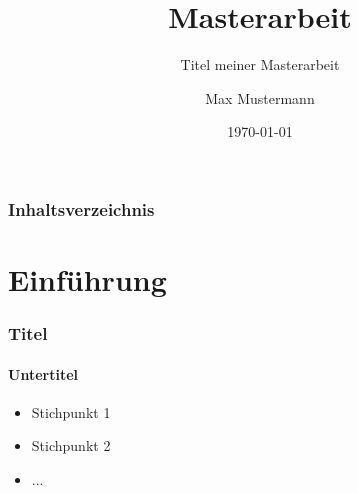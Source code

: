 \documentclass{beamer}
\title{Masterarbeit}
\subtitle{Titel meiner Masterarbeit}
\author{Max Mustermann}
\date{\today}
\institute{Hochschule Musterstadt}
\begin{document}
	
\begin{frame}
	\titlepage
\end{frame}

\begin{frame}
	\frametitle{Inhaltsverzeichnis}
	\tableofcontents
\end{frame}

\section{Einführung}
\begin{frame}
	\frametitle{Titel}
	\framesubtitle{Untertitel}
	\begin{itemize}
		\item Stichpunkt 1
		\item Stichpunkt 2
		\item ...
	\end{itemize}
\end{frame}
\end{document}
